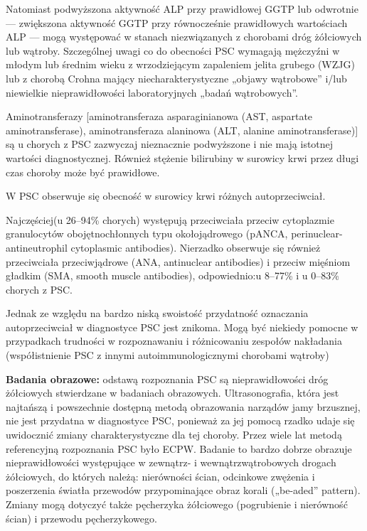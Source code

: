 Natomiast podwyższona aktywność ALP przy prawidłowej  GGTP  lub  odwrotnie  —  zwiększona  aktywność  GGTP  przy  równocześnie prawidłowych  wartościach  ALP  —  mogą  występować w stanach niezwiązanych z chorobami  dróg  żółciowych  lub  wątroby.  
Szczególnej uwagi  co  do  obecności  PSC wymagają  mężczyźni w  młodym  lub  średnim  wieku  z  wrzodziejącym zapaleniem jelita grubego (WZJG) lub z chorobą  Crohna  mający  niecharakterystyczne „objawy  wątrobowe”  i/lub  niewielkie  nieprawidłowości  laboratoryjnych  „badań  wątrobowych”.  

Aminotransferazy  [aminotransferaza asparaginianowa (AST, aspartate  aminotransferase), aminotransferaza alaninowa (ALT, alanine aminotransferase)]  są  u  chorych  z  PSC zazwyczaj nieznacznie podwyższone i nie mają istotnej wartości diagnostycznej. 
Również stężenie  bilirubiny  w  surowicy  krwi  przez  długi czas choroby może być prawidłowe.

W  PSC  obserwuje  się  obecność  w  surowicy krwi różnych autoprzeciwciał. 

Najczęściej(u  26–94\%  chorych)  występują  przeciwciała przeciw  cytoplazmie  granulocytów  obojętnochłonnych  typu  okołojądrowego  (pANCA, perinuclear-antineutrophil cytoplasmic antibodies). 
Nierzadko obserwuje się również przeciwciała  przeciwjądrowe  (ANA,  antinuclear antibodies) i przeciw mięśniom gładkim (SMA, smooth  muscle  antibodies),  odpowiednio:u 8–77\% i u 0–83\% chorych z PSC. 

Jednak ze względu na bardzo niską swoistość przydatność oznaczania autoprzeciwciał w diagnostyce PSC jest znikoma. 
Mogą być niekiedy pomocne w przypadkach trudności w rozpoznawaniu  i  różnicowaniu  zespołów  nakładania (współistnienie PSC z innymi autoimmunologicznymi chorobami wątroby)

\textbf{Badania obrazowe:} odstawą rozpoznania PSC są nieprawidłowości  dróg  żółciowych  stwierdzane  w  badaniach  obrazowych.  
Ultrasonografia,  która jest najtańszą i powszechnie dostępną metodą obrazowania narządów jamy brzusznej, nie jest przydatna w diagnostyce PSC, ponieważ za jej pomocą  rzadko  udaje  się  uwidocznić  zmiany charakterystyczne dla tej choroby. 
Przez wiele  lat  metodą  referencyjną  rozpoznania  PSC było  ECPW.  
Badanie  to  bardzo  dobrze obrazuje nieprawidłowości występujące w zewnątrz- i wewnątrzwątrobowych drogach żółciowych, do których należą: nierówności ścian, odcinkowe  zwężenia  i  poszerzenia  światła przewodów przypominające obraz korali („be-aded” pattern). 
Zmiany mogą dotyczyć także  pęcherzyka  żółciowego  (pogrubienie i nierówność ścian) i przewodu pęcherzykowego. 

